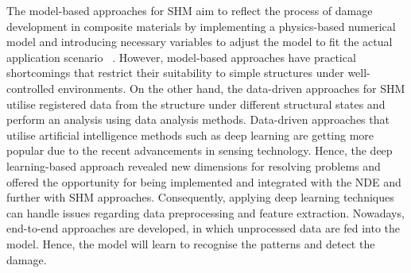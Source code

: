 The model-based approaches for SHM aim to reflect the process of damage development in composite materials by implementing a physics-based numerical model and introducing necessary variables to adjust the model to fit the actual application scenario ~\cite{Wu2021}. 
However, model-based approaches have practical shortcomings that restrict their suitability to simple structures under well-controlled environments.
%
%
On the other hand, the data-driven approaches for SHM utilise registered data from the structure under different structural states and perform an analysis using data analysis methods.
Data-driven approaches that utilise artificial intelligence methods such as deep learning are getting more popular due to the recent advancements in sensing technology.
Hence, the deep learning-based approach revealed new dimensions for resolving problems and offered the opportunity for being implemented and integrated with the NDE and further with SHM approaches. 
Consequently, applying deep learning techniques can handle issues regarding data preprocessing and feature extraction.
Nowadays, end-to-end approaches are developed, in which unprocessed data are fed into the model.
Hence, the model will learn to recognise the patterns and detect the damage.
%

